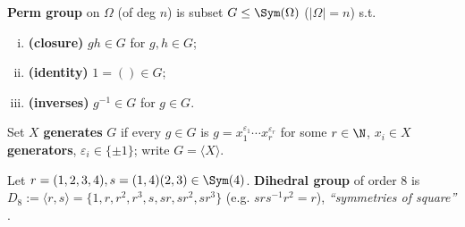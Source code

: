 \begin{slide}
    \begin{definition}
        \vspace{0pt}
        \textbf{Perm group} on $\Omega$ (of deg $n$) is subset $G \leq \Sym(\Omega)$ ($|\Omega| = n$) s.t.
        \begin{enumerate}[(i)]
            \item \textbf{(closure)} $gh \in G$ for $g,h \in G$; \pause
            \item \textbf{(identity)} $1 = () \in G$; \pause
            \item \textbf{(inverses)} $g^{-1} \in G$ for $g \in G$.
        \end{enumerate}
    \end{definition} \pause

    \begin{definition}[generator]
        \vspace{0pt}
        Set $X$ \textbf{generates} $G$ if every $g \in G$ is $g = x_1^{\varepsilon_1} \dotsb x_r^{\varepsilon_r}$ for some $r \in \N$, $x_i \in X$ \textbf{generators}, $\varepsilon_i \in \{\pm 1\}$; write $G = \langle X \rangle$.
    \end{definition} \pause

    \begin{example}
        \vspace{0pt}
        Let $r = (1,2,3,4),s = (1,4)(2,3) \in \Sym(4)$. \textbf{Dihedral group} of order 8 is $D_8 := \langle r,s \rangle = \{1,r,r^2,r^3,s,sr,sr^2,sr^3\}$ (e.g. $srs^{-1}r^2 = r$), \textit{``symmetries of square''} .
    \end{example}
\end{slide}


